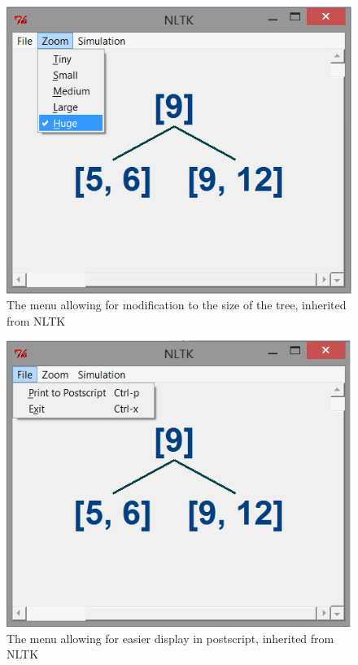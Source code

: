 \documentclass[fleqn]{article}
\begin{document}
\begin{figure}[h!]
\centerline{\includegraphics{Images/gui4.png}}
\caption{The menu allowing for modification to the size of the tree, inherited from NLTK}
\end{figure}

\begin{figure}[h!]
\centerline{\includegraphics{Images/gui3.png}}
\caption{The menu allowing for easier display in postscript, inherited from NLTK}
\end{figure}
\end{document}
